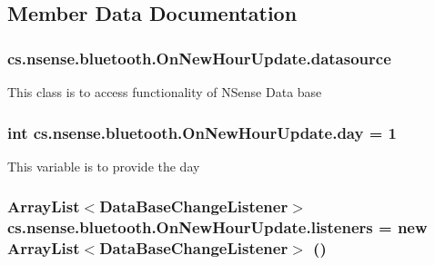 \subsection{Member Data Documentation}
\hypertarget{classcs_1_1nsense_1_1bluetooth_1_1_on_new_hour_update_ad2b435c849101095e6dba4a2a98114b9}{
\subsubsection[{datasource}]{ cs.\-nsense.\-bluetooth.\-On\-New\-Hour\-Update.\-datasource\hspace{0.3cm}{\ttfamily [private]}}}\label{classcs_1_1nsense_1_1bluetooth_1_1_on_new_hour_update_ad2b435c849101095e6dba4a2a98114b9}
This class is to access functionality of N\-Sense Data base \hypertarget{classcs_1_1nsense_1_1bluetooth_1_1_on_new_hour_update_af48725ea7ecf9a8b98d4cf1e701990cd}{
\subsubsection[{day}]{\setlength{\rightskip}{0pt plus 5cm}int cs.\-nsense.\-bluetooth.\-On\-New\-Hour\-Update.\-day = 1\hspace{0.3cm}{\ttfamily [static]}}}\label{classcs_1_1nsense_1_1bluetooth_1_1_on_new_hour_update_af48725ea7ecf9a8b98d4cf1e701990cd}
This variable is to provide the day \hypertarget{classcs_1_1nsense_1_1bluetooth_1_1_on_new_hour_update_a3093596cccb264d41d61b3dc82b1a7ba}{
\subsubsection[{listeners}]{\setlength{\rightskip}{0pt plus 5cm}Array\-List$<${\bf Data\-Base\-Change\-Listener}$>$ cs.\-nsense.\-bluetooth.\-On\-New\-Hour\-Update.\-listeners = new Array\-List$<${\bf Data\-Base\-Change\-Listener}$>$ ()\hspace{0.3cm}{\ttfamily [private]}}}\label{classcs_1_1nsense_1_1bluetooth_1_1_on_new_hour_update_a3093596cccb264d41d61b3dc82b1a7ba}
